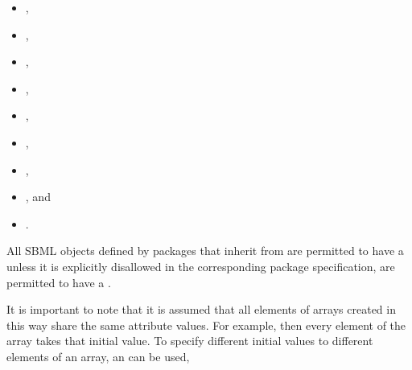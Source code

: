 \nolinenumbers
\begin{multicols}{3}
\begin{itemize}\setlength{\parskip}{-0.2ex}
\item \Delay,
\item \FunctionDefinition,
\item \KineticLaw,
\begin{blockChanged}
\item \ListOfUnits,
\item \ListOfUnitDefinitions,
\item \ListOfLocalParameters,
\item \ListOfCompartments,
\item \ListOfSpecies,
\item \ListOfParameters,
\item \ListOfInitialAssignments,
\item \ListOfRules,
\item \ListOfConstraints,
\item \ListOfReactions,
\item \ListOfSpeciesReferences,
\item \ListOfEvents,
\item \ListOfEventAssignments,
\end{blockChanged}
\item \LocalParameter,
\item \Model,
\item \Priority,
\item \Trigger,
\item \Unit, and
\item \UnitDefinition.
\end{itemize}
\end{multicols}
\linenumbers

All SBML objects defined by packages that inherit from \SBase are permitted to have a \ListOfDimensions unless it is explicitly disallowed in the corresponding package specification,  are permitted to have a \ListOfDimensions.

It is important to note that it is assumed that all elements of arrays created in this way share the same attribute values.   For example,    then every element of the array takes that initial value.   To specify different initial values to different elements of an array, an \InitialAssignment can be used, 

